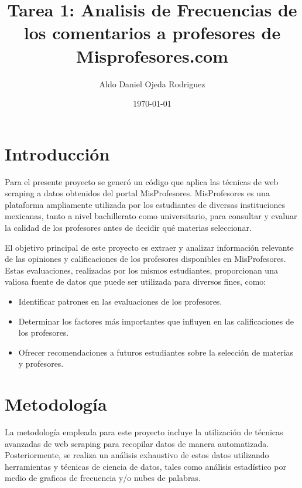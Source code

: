 \documentclass[a4paper,12pt]{article}
\title{Tarea 1:  Analisis de Frecuencias de los comentarios a profesores de Misprofesores.com}
\author{Aldo Daniel Ojeda Rodriguez}
\date{\today}
\begin{document}
\maketitle

\begin{abstract}
\end{abstract}

\section{Introducción}

Para el presente proyecto se generó un código que aplica las técnicas de web scraping a datos obtenidos del portal MisProfesores. MisProfesores es una plataforma ampliamente utilizada por los estudiantes de diversas instituciones mexicanas, tanto a nivel bachillerato como universitario, para consultar y evaluar la calidad de los profesores antes de decidir qué materias seleccionar.

El objetivo principal de este proyecto es extraer y analizar información relevante de las opiniones y calificaciones de los profesores disponibles en MisProfesores. Estas evaluaciones, realizadas por los mismos estudiantes, proporcionan una valiosa fuente de datos que puede ser utilizada para diversos fines, como:

\begin{itemize}
    \item Identificar patrones en las evaluaciones de los profesores.
    \item Determinar los factores más importantes que influyen en las calificaciones de los profesores.
    \item Ofrecer recomendaciones a futuros estudiantes sobre la selección de materias y profesores.
\end{itemize}

\section{Metodología}

 La metodología empleada para este proyecto incluye la utilización de técnicas avanzadas de web scraping para recopilar datos de manera automatizada. Posteriormente, se realiza un análisis exhaustivo de estos datos utilizando herramientas y técnicas de ciencia de datos, tales como análisis estadístico por medio de graficos de frecuencia y/o nubes de palabras.
\end{document}
